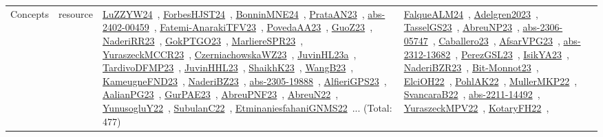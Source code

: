 {\begin{longtable}{lp{3cm}>{\raggedright\arraybackslash}p{6cm}>{\raggedright\arraybackslash}p{6cm}>{\raggedright\arraybackslash}p{8cm}}
Concepts & resource & \href{../works/LuZZYW24.pdf}{LuZZYW24}~\cite{LuZZYW24}, \href{../works/ForbesHJST24.pdf}{ForbesHJST24}~\cite{ForbesHJST24}, \href{../works/BonninMNE24.pdf}{BonninMNE24}~\cite{BonninMNE24}, \href{../works/PrataAN23.pdf}{PrataAN23}~\cite{PrataAN23}, \href{../works/abs-2402-00459.pdf}{abs-2402-00459}~\cite{abs-2402-00459}, \href{../works/Fatemi-AnarakiTFV23.pdf}{Fatemi-AnarakiTFV23}~\cite{Fatemi-AnarakiTFV23}, \href{../works/PovedaAA23.pdf}{PovedaAA23}~\cite{PovedaAA23}, \href{../works/GuoZ23.pdf}{GuoZ23}~\cite{GuoZ23}, \href{../works/NaderiRR23.pdf}{NaderiRR23}~\cite{NaderiRR23}, \href{../works/GokPTGO23.pdf}{GokPTGO23}~\cite{GokPTGO23}, \href{../works/MarliereSPR23.pdf}{MarliereSPR23}~\cite{MarliereSPR23}, \href{../works/YuraszeckMCCR23.pdf}{YuraszeckMCCR23}~\cite{YuraszeckMCCR23}, \href{../works/CzerniachowskaWZ23.pdf}{CzerniachowskaWZ23}~\cite{CzerniachowskaWZ23}, \href{../works/JuvinHL23a.pdf}{JuvinHL23a}~\cite{JuvinHL23a}, \href{../works/TardivoDFMP23.pdf}{TardivoDFMP23}~\cite{TardivoDFMP23}, \href{../works/JuvinHHL23.pdf}{JuvinHHL23}~\cite{JuvinHHL23}, \href{../works/ShaikhK23.pdf}{ShaikhK23}~\cite{ShaikhK23}, \href{../works/WangB23.pdf}{WangB23}~\cite{WangB23}, \href{../works/KameugneFND23.pdf}{KameugneFND23}~\cite{KameugneFND23}, \href{../works/NaderiBZ23.pdf}{NaderiBZ23}~\cite{NaderiBZ23}, \href{../works/abs-2305-19888.pdf}{abs-2305-19888}~\cite{abs-2305-19888}, \href{../works/AlfieriGPS23.pdf}{AlfieriGPS23}~\cite{AlfieriGPS23}, \href{../works/AalianPG23.pdf}{AalianPG23}~\cite{AalianPG23}, \href{../works/GurPAE23.pdf}{GurPAE23}~\cite{GurPAE23}, \href{../works/AbreuPNF23.pdf}{AbreuPNF23}~\cite{AbreuPNF23}, \href{../works/AbreuN22.pdf}{AbreuN22}~\cite{AbreuN22}, \href{../works/YunusogluY22.pdf}{YunusogluY22}~\cite{YunusogluY22}, \href{../works/SubulanC22.pdf}{SubulanC22}~\cite{SubulanC22}, \href{../works/EtminaniesfahaniGNMS22.pdf}{EtminaniesfahaniGNMS22}~\cite{EtminaniesfahaniGNMS22}... (Total: 477) & \href{../works/FalqueALM24.pdf}{FalqueALM24}~\cite{FalqueALM24}, \href{../works/Adelgren2023.pdf}{Adelgren2023}~\cite{Adelgren2023}, \href{../works/TasselGS23.pdf}{TasselGS23}~\cite{TasselGS23}, \href{../works/AbreuNP23.pdf}{AbreuNP23}~\cite{AbreuNP23}, \href{../works/abs-2306-05747.pdf}{abs-2306-05747}~\cite{abs-2306-05747}, \href{../works/Caballero23.pdf}{Caballero23}~\cite{Caballero23}, \href{../works/AfsarVPG23.pdf}{AfsarVPG23}~\cite{AfsarVPG23}, \href{../works/abs-2312-13682.pdf}{abs-2312-13682}~\cite{abs-2312-13682}, \href{../works/PerezGSL23.pdf}{PerezGSL23}~\cite{PerezGSL23}, \href{../works/IsikYA23.pdf}{IsikYA23}~\cite{IsikYA23}, \href{../works/NaderiBZR23.pdf}{NaderiBZR23}~\cite{NaderiBZR23}, \href{../works/Bit-Monnot23.pdf}{Bit-Monnot23}~\cite{Bit-Monnot23}, \href{../works/ElciOH22.pdf}{ElciOH22}~\cite{ElciOH22}, \href{../works/PohlAK22.pdf}{PohlAK22}~\cite{PohlAK22}, \href{../works/MullerMKP22.pdf}{MullerMKP22}~\cite{MullerMKP22}, \href{../works/SvancaraB22.pdf}{SvancaraB22}~\cite{SvancaraB22}, \href{../works/abs-2211-14492.pdf}{abs-2211-14492}~\cite{abs-2211-14492}, \href{../works/YuraszeckMPV22.pdf}{YuraszeckMPV22}~\cite{YuraszeckMPV22}, \href{../works/KotaryFH22.pdf}{KotaryFH22}~\cite{KotaryFH22}, 
\end{longtable}}
